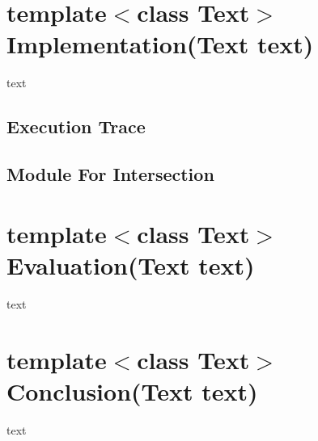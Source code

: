 \chapter{template$<$class Text$>$ Implementation(Text text)}
\label{ch:impl}
text

\section{Execution Trace}
\section{Module For Intersection}

\chapter{template$<$class Text$>$ Evaluation(Text text)}
\label{ch:eval}
text

\chapter{template$<$class Text$>$ Conclusion(Text text)}
\label{ch:concl}
text
